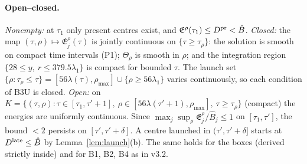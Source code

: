 \documentclass[11pt]{article}
\theoremstyle{remark}\newtheorem{remark}[theorem]{Remark}
\newcommand{\E}{\mathfrak E}
\begin{document}
\paragraph{Open--closed.} \emph{Nonempty:} at $\tau_1$ only present centres exist, and $\E^\rho(\tau_1)\le D^{\rm pr}<\hat B$. \emph{Closed:} the map $(\tau,\rho)\mapsto\E^\rho_j(\tau)$ is jointly continuous on $\{\tau\ge\tau_\rho\}$: the solution is smooth on compact time intervals (P1); $\Theta_\rho$ is smooth in $\rho$; and the integration region $\{28\le y,\ r\le379.5\lambda_1\}$ is compact for bounded $\tau$. The launch set $\{\rho:\tau_\rho\le\tau\}=[56\lambda(\tau),\rho_{\max}]\cup\{\rho\ge56\lambda_1\}$ varies continuously, so each condition of B3U is closed. \emph{Open:} on $K=\{(\tau,\rho):\tau\in[\tau_1,\tau'+1],\ \rho\in[56\lambda(\tau'+1),\rho_{\max}],\ \tau\ge\tau_\rho\}$ (compact) the energies are uniformly continuous. Since $\max_j\sup_\rho\E^\rho_j/\hat B_j\le1$ on $[\tau_1,\tau']$, the bound $<2$ persists on $[\tau',\tau'+\delta]$. A centre launched in $(\tau',\tau'+\delta]$ starts at $D^{\rm late}\le\hat B$ by Lemma~\ref{lem:launch}(b). The same holds for the boxes (derived strictly inside) and for B1, B2, B4 as in v3.2.
\end{document}

